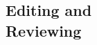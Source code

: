 \documentclass[margin,line]{resume}
\begin{document}
\begin{resume}



    \section{\mysidestyle Editing and\\Reviewing}


\end{resume}
\end{document}
